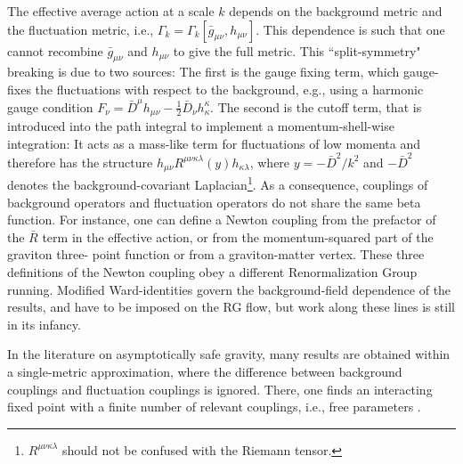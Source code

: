 \documentclass[11pt]{book} %
\numberwithin{equation}{chapter}
\begin{document}
The effective average action at a scale $k$
depends on the background metric and the fluctuation metric,
i.e., $\Gamma_k = \Gamma_k[\bar{g}_{\mu \nu}, h_{\mu \nu}]$.
This dependence is such that one cannot recombine $\bar{g}_{\mu \nu}$
and $h_{\mu \nu}$ to give the full metric.
This ``split-symmetry" breaking is due to two sources:
The first is the gauge fixing term, which gauge-fixes the fluctuations with respect to the background,
e.g., using a harmonic gauge condition
$F_{\nu}=\bar{D}^{\mu}h_{\mu \nu} -\frac{1}{2} \bar{D}_{\nu}h^{\kappa}_{\kappa}$.
The second is the cutoff term, that is introduced into the path integral to implement
a momentum-shell-wise integration: It acts as a mass-like term for fluctuations of low momenta and
therefore has the structure $h_{\mu \nu} R^{\mu \nu \kappa \lambda} (y) h_{\kappa \lambda}$,
where $y=-\bar{D}^2/k^2$ and $-\bar{D}^2$ denotes the background-covariant
Laplacian\footnote{$R^{\mu \nu \kappa \lambda}$ should not be confused with the
Riemann tensor.}.
As a consequence, couplings of background operators and fluctuation operators do not share the same
beta function. For instance, one can define a Newton coupling from the prefactor of the $\bar{R}$ term
in the effective action, or from the momentum-squared part of the graviton three- point function or
from a graviton-matter vertex.
These three definitions of the Newton coupling obey a different Renormalization Group running.
Modified Ward-identities govern the background-field dependence of the results,
and have to be imposed on the RG flow, but work along these lines is still in its infancy.

In the literature on asymptotically safe gravity, many results are obtained within a
single-metric approximation, where the difference between background couplings and fluctuation couplings
is ignored. There, one finds an interacting fixed point with a finite number of relevant couplings,
i.e., free parameters
\cite{
  Reuter:1996cp, Dou:1997fg, Reuter:2001ag, Lauscher:2001ya, Lauscher:2002sq, Litim:2003vp,
  Fischer:2006fz, Machado:2007ea, Eichhorn:2009ah, Codello:2006in, Codello:2008vh,
  Benedetti:2009rx, Eichhorn:2010tb, Groh:2010ta, Manrique:2011jc, Rechenberger:2012dt, Benedetti:2012dx,
  Dietz:2012ic, Falls:2013bv, Benedetti:2013jk, Ohta:2013uca, Demmel:2014sga, Falls:2014tra, Falls:2015qga,
  Falls:2015cta, Gies:2015tca, Demmel:2015oqa}.
\end{document}
